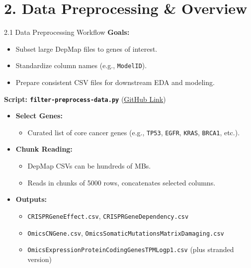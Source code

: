 \documentclass[10pt]{beamer}
\let\oldhref\href
\renewcommand{\href}[2]{\oldhref{#1}{\uline{#2}}}
\begin{document}
\section{2. Data Preprocessing \& Overview}

\begin{frame}{2.1 Data Preprocessing Workflow}
  \textbf{Goals:} 
  \begin{itemize}
    \item Subset large DepMap files to genes of interest.
    \item Standardize column names (e.g., \texttt{ModelID}).
    \item Prepare consistent CSV files for downstream EDA and modeling.
  \end{itemize}

  \vspace{0.3cm}
  \textbf{Script: \texttt{filter-preprocess-data.py}} (\href{https://github.com/ChestnutKurisu/MED263_Final_Project_WI25/blob/main/preprocessing-pipeline/filter-preprocess-data.py}{GitHub Link})
  \begin{itemize}
    \item \textbf{Select Genes:} 
      \begin{itemize}
        \item Curated list of core cancer genes (e.g., \texttt{TP53}, \texttt{EGFR}, \texttt{KRAS}, \texttt{BRCA1}, etc.).
      \end{itemize}
    \item \textbf{Chunk Reading:}
      \begin{itemize}
        \item DepMap CSVs can be hundreds of MBs.
        \item Reads in chunks of 5000 rows, concatenates selected columns.
      \end{itemize}
    \item \textbf{Outputs:}
      \begin{itemize}
        \item \texttt{CRISPRGeneEffect.csv}, \texttt{CRISPRGeneDependency.csv}
        \item \texttt{OmicsCNGene.csv}, \texttt{OmicsSomaticMutationsMatrixDamaging.csv}
        \item \texttt{OmicsExpressionProteinCodingGenesTPMLogp1.csv} (plus stranded version)
      \end{itemize}
  \end{itemize}

\end{frame}
\end{document}
